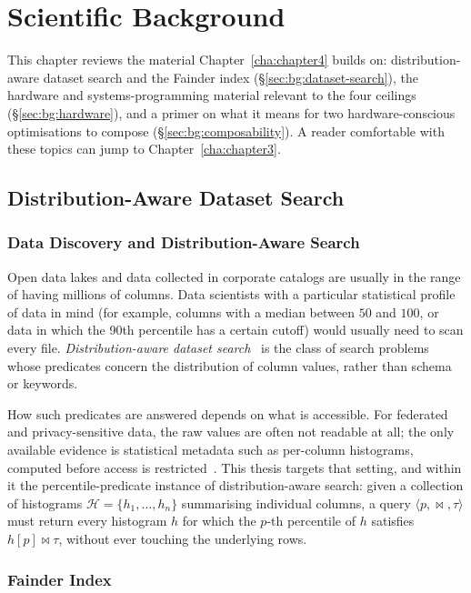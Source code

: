 \chapter{Scientific Background\label{cha:chapter2}}

This chapter reviews the material Chapter~\ref{cha:chapter4} builds on: distribution-aware dataset search and the Fainder index (§\ref{sec:bg:dataset-search}), the hardware and systems-programming material relevant to the four ceilings (§\ref{sec:bg:hardware}), and a primer on what it means for two hardware-conscious optimisations to compose (§\ref{sec:bg:composability}).
A reader comfortable with these topics can jump to Chapter~\ref{cha:chapter3}.

\section{Distribution-Aware Dataset Search\label{sec:bg:dataset-search}}

\subsection{Data Discovery and Distribution-Aware Search}

Open data lakes and data collected in corporate catalogs are usually in the range of having millions of columns. Data scientists with a particular statistical profile of data in mind (for example, columns with a median between $50$ and $100$, or data in which the 90th percentile has a certain cutoff) would usually need to scan every file. \emph{Distribution-aware dataset search}~\cite{behme_2024} is the class of search problems whose predicates concern the distribution of column values, rather than schema or keywords.

How such predicates are answered depends on what is accessible. For federated and privacy-sensitive data, the raw values are often not readable at all; the only available evidence is statistical metadata such as per-column histograms, computed before access is restricted~\cite{behme_2024}. This thesis targets that setting, and within it the percentile-predicate instance of distribution-aware search: given a collection of histograms $\mathcal{H} = \{h_1, \ldots, h_n\}$ summarising individual columns, a query $\langle p, \bowtie, \tau \rangle$ must return every histogram $h$ for which the $p$-th percentile of $h$ satisfies $h[p] \bowtie \tau$, without ever touching the underlying rows.

\subsection{Fainder Index}

